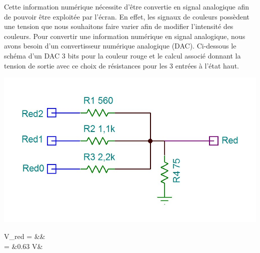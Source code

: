 \noindent Cette information numérique nécessite d'être convertie en signal analogique afin de pouvoir être exploitée par l'écran. En effet, les signaux de couleurs possèdent une tension que nous souhaitons faire varier afin de modifier l'intensité des couleurs. Pour convertir une information numérique en signal analogique, nous avons besoin d'un convertisseur numérique analogique (DAC). Ci-dessous le schéma d'un DAC 3 bits pour la couleur rouge et le calcul associé donnant la tension de sortie avec ce choix de résistances pour les 3 entrées à l'état haut.\\

\begin{multicols}{2}
	\noindent
	\begin{minipage}{\linewidth}
		\centering
		\includegraphics[scale = 0.25]{images/simple_dac.jpg}
		\label{fig:vgadac}
	\end{minipage}
	
	\begin{flalign*}
	V_{red} = &&\\
			= &0.63 V&
	\end{flalign*}
\end{multicols}

